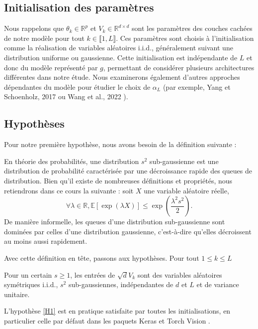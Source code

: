 \subsection{Initialisation des paramètres} 
Nous rappelons que $\theta_k \in \mathbb{R}^p$ et $V_k \in \mathbb{R}^{d \times d}$ sont les paramètres des couches cachées de notre modèle pour tout $k \in \llbracket 1, L \rrbracket$. Ces paramètres sont choisis à l'initialisation comme la réalisation de variables aléatoires i.i.d., généralement suivant une distribution uniforme ou gaussienne. Cette initialisation est indépendante de $L$ et donc du modèle représenté par $g$, permettant de considérer plusieurs architectures différentes dans notre étude. Nous examinerons également d'autres approches dépendantes du modèle pour étudier le choix de $\alpha_L$ (par exemple, Yang et Schoenholz, 2017 ou Wang et al., 2022 \cite{torchvision2016}).

\subsection{Hypothèses}
Pour notre première hypothèse, nous avons besoin de la définition suivante :
\begin{definition}
    En théorie des probabilités, une distribution $s^2$ sub-gaussienne est une distribution de probabilité caractérisée par une décroissance rapide des queues de distribution. Bien qu'il existe de nombreuses définitions et propriétés, nous retiendrons dans ce cours la suivante : soit $X$ une variable aléatoire réelle,
    \[
        \forall \lambda \in \mathbb{R}, \mathbb{E}[\exp(\lambda X)] \leq \exp\left(\frac{\lambda^2 s^2}{2}\right).
    \]
    De manière informelle, les queues d'une distribution sub-gaussienne sont dominées par celles d'une distribution gaussienne, c'est-à-dire qu'elles décroissent au moins aussi rapidement.
\end{definition}

Avec cette définition en tête, passons aux hypothèses. Pour tout $ 1 \leq  k \leq L  $
\begin{assumption}\label{H1}
    Pour un certain $ s \geq 1 $, les entrées de  $ \sqrt{d}V_k $ sont des variables aléatoires symétriques i.i.d., $ s^2 $ sub-gaussiennes, indépendantes de $ d $ et $ L $ et de variance unitaire.
\end{assumption}
\begin{note}
    L'hypothèse \ref{H1} est en pratique satisfaite par toutes les initialisations, en particulier celle par défaut dans les paquets Keras \cite{torchvision2016} et Torch Vision \cite{torchvision2016}.
\end{note}

